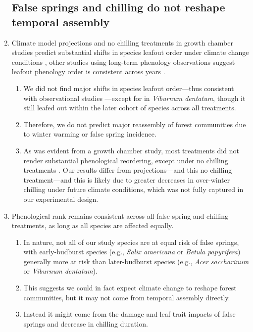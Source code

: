 \documentclass{article}\usepackage[]{graphicx}\usepackage[]{color}
\begin{document}
\begin{enumerate}
\subsection*{False springs and chilling do not reshape temporal assembly}
\item Climate model projections and no chilling treatments in growth chamber studies predict substantial shifts in species leafout order under climate change conditions \citep{Roberts2015, Laube2014}, other studies using long-term phenology observations suggest leafout phenology order is consistent across years \citep{Wesolowski2006}.
  \begin{enumerate}
  \item We did not find major shifts in species leafout order---thus consistent with observational studies \citep{Wesolowski2006}---except for in \textit{Viburnum dentatum}, though it still leafed out within the later cohort of species across all treatments.
  \item Therefore, we do not predict major reassembly of forest communities due to winter warming or false spring incidence. 
  \item As was evident from a growth chamber study, most treatments did not render substantial phenological reordering, except under no chilling treatments \citep{Laube2014}. Our results differ from projections---and this no chilling treatment---and this is likely due to greater decreases in over-winter chilling under future climate conditions, which was not fully captured in our experimental design. %
    \end{enumerate}
    
\item Phenological rank remains consistent across all false spring and chilling treatments, as long as all species are affected equally.
  \begin{enumerate}
  \item In nature, not all of our study species are at equal risk of false springs, with early-budburst species (e.g., \textit{Salix americana} or \textit{Betula papyrifera}) generally more at risk than later-budburst species (e.g., \textit{Acer saccharinum} or \textit{Viburnum dentatum}). 
  \item This suggests we could in fact expect climate change to reshape forest communities, but it may not come from temporal assembly directly. 
  \item Instead it might come from the damage and leaf trait impacts of false springs and decrease in chilling duration. %
  \end{enumerate}


\end{enumerate}
\end{document}
